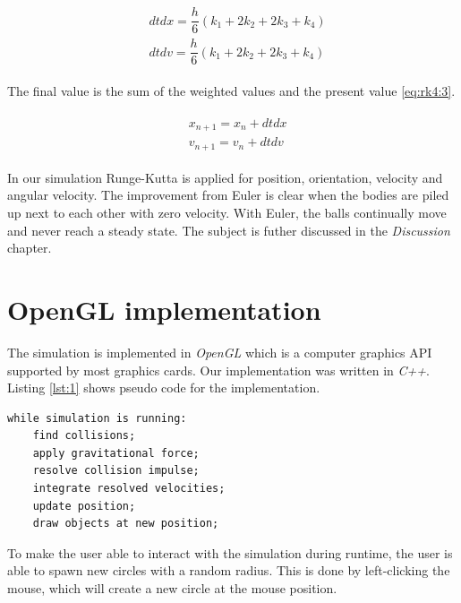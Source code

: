 \documentclass[a4paper,12pt]{report}
\begin{document}
\begin{equation}
\begin{split}
\begin{aligned}
& dtdx = \dfrac{h}{6}(k_{1}+2k_{2}+2k_{3}+k_{4}) \\
& dtdv = \dfrac{h}{6}(k_{1}+2k_{2}+2k_{3}+k_{4})
\end{aligned}
\end{split}
\label{eq:rk4:2}
\end{equation}

The final value is the sum of the weighted values and the present value \eqref{eq:rk4:3}.

\begin{equation}
\begin{split}
\begin{aligned}
& x_{n+1}=x_n+dtdx\\
& v_{n+1}=v_n+dtdv
\end{aligned}
\end{split}
\label{eq:rk4:3}
\end{equation}

In our simulation Runge-Kutta is applied for position, orientation, velocity and angular velocity. The improvement from Euler is clear when the bodies are piled up next to each other with zero velocity. With Euler, the balls continually move and never reach a steady state. The subject is futher discussed in the \emph{Discussion} chapter.


\section{OpenGL implementation}
\label{sec:opengl}

The simulation is implemented in \emph{OpenGL} which is a computer graphics API supported by most graphics cards. Our implementation was written in \emph{C++}. Listing \ref{lst:1} shows pseudo code for the implementation.

\begin{lstlisting}[caption={Pseudo code for the simulation loop.}, label=lst:1]
while simulation is running:
    find collisions;
    apply gravitational force;
    resolve collision impulse;
    integrate resolved velocities;
    update position;
    draw objects at new position;
\end{lstlisting}

To make the user able to interact with the simulation during runtime, the user is able to spawn new circles with a random radius. This is done by left-clicking the mouse, which will create a new circle at the mouse position.
\end{document}
